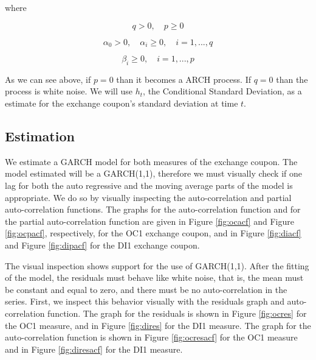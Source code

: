\documentclass[cic,tc, english]{iiufrgs}
\begin{document}
    where

    $$q > 0, \quad   p \geq 0$$

    $$\alpha_0 > 0, \quad  \alpha_i \geq 0, \quad  i=1,...,q$$

    $$\beta_i \geq 0, \quad  i=1,...,p$$

    As we can see above, if $p = 0$ than it becomes a ARCH process. If $q = 0$ than the process is white noise. We will use $h_t$, the Conditional Standard Deviation, as a estimate for the exchange coupon's standard deviation at time $t$.

\subsection{Estimation} \label{chapter_estimation}

    We estimate a GARCH model for both measures of the exchange coupon. The model estimated will be a GARCH(1,1), therefore we must visually check if one lag for both the auto regressive and the moving average parts of the model is appropriate. We do so by visually inspecting the auto-correlation and partial auto-correlation functions. The graphs for the auto-correlation function and for the partial auto-correlation function are given in Figure \ref{fig:ocacf} and Figure \ref{fig:ocpacf}, respectively, for the OC1 exchange coupon, and in Figure \ref{fig:diacf} and Figure \ref{fig:dipacf} for the DI1 exchange coupon.

    

    

    

    

    The visual inspection shows support for the use of GARCH(1,1). After the fitting of the model, the residuals must behave like white noise, that is, the mean must be constant and equal to zero, and there must be no auto-correlation in the series. First, we inspect this behavior visually with the residuals graph and auto-correlation function. The graph for the residuals is shown in Figure \ref{fig:ocres} for the OC1 measure, and in Figure \ref{fig:dires} for the DI1 measure. The graph for the auto-correlation function is shown in Figure \ref{fig:ocresacf} for the OC1 measure and in Figure \ref{fig:diresacf} for the DI1 measure.

    

    
\end{document}
